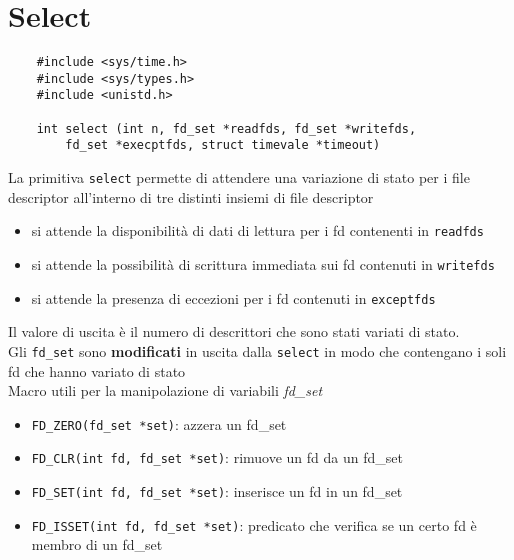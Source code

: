 \documentclass[italian,12pt,a4paper]{article}
\begin{document}
\section{Select}
\begin{verbatim}
	#include <sys/time.h>
	#include <sys/types.h>
	#include <unistd.h>
	
	int select (int n, fd_set *readfds, fd_set *writefds,
		fd_set *execptfds, struct timevale *timeout)
\end{verbatim}
La primitiva \verb|select| permette di attendere una variazione di stato per i file descriptor all'interno di tre distinti insiemi di file descriptor 
\begin{itemize}
	\item si attende la disponibilità di dati di lettura per i fd contenenti in \verb|readfds|
	\item si attende la possibilità di scrittura immediata sui fd contenuti in \verb|writefds|
	\item si attende la presenza di eccezioni per i fd contenuti in \verb|exceptfds|
\end{itemize}
Il valore di uscita è il numero di descrittori che sono stati variati di stato.\\
Gli \verb|fd_set| sono \textbf{modificati} in uscita dalla \verb|select| in modo che contengano i soli fd che hanno variato di stato\\
Macro utili per la manipolazione di variabili \textit{fd\_set}
\begin{itemize}
	\item \verb|FD_ZERO(fd_set *set)|: azzera un fd\_set
	\item \verb|FD_CLR(int fd, fd_set *set)|: rimuove un fd da un fd\_set
	\item \verb|FD_SET(int fd, fd_set *set)|: inserisce un fd in un fd\_set
	\item \verb|FD_ISSET(int fd, fd_set *set)|: predicato che verifica se un certo fd è membro di un fd\_set
\end{itemize}





\newpage
\listoffigures
\end{document}

